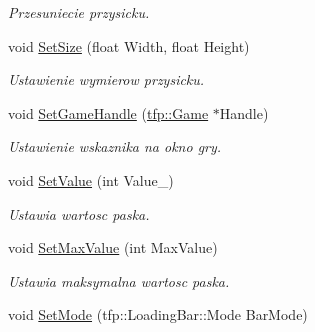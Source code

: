 \begin{DoxyCompactItemize}
\begin{DoxyCompactList}\small\item\em Przesuniecie przysicku. \end{DoxyCompactList}\item 
\mbox{\label{classtfp_1_1_loading_bar_ae297a4644a6892b6477ac21337033532}} 
void \mbox{\hyperlink{classtfp_1_1_loading_bar_ae297a4644a6892b6477ac21337033532}{Set\+Size}} (float Width, float Height)
\begin{DoxyCompactList}\small\item\em Ustawienie wymierow przysicku. \end{DoxyCompactList}\item 
\mbox{\label{classtfp_1_1_loading_bar_a326f9f40be8186b81ccc4636471fc3a9}} 
void \mbox{\hyperlink{classtfp_1_1_loading_bar_a326f9f40be8186b81ccc4636471fc3a9}{Set\+Game\+Handle}} (\mbox{\hyperlink{classtfp_1_1_game}{tfp\+::\+Game}} $\ast$Handle)
\begin{DoxyCompactList}\small\item\em Ustawienie wskaznika na okno gry. \end{DoxyCompactList}\item 
\mbox{\label{classtfp_1_1_loading_bar_a64a154f429156f741b6915f9c16e553a}} 
void \mbox{\hyperlink{classtfp_1_1_loading_bar_a64a154f429156f741b6915f9c16e553a}{Set\+Value}} (int Value\+\_\+)
\begin{DoxyCompactList}\small\item\em Ustawia wartosc paska. \end{DoxyCompactList}\item 
\mbox{\label{classtfp_1_1_loading_bar_a69eba1f326367ef7f1554ea4b1c87065}} 
void \mbox{\hyperlink{classtfp_1_1_loading_bar_a69eba1f326367ef7f1554ea4b1c87065}{Set\+Max\+Value}} (int Max\+Value)
\begin{DoxyCompactList}\small\item\em Ustawia maksymalna wartosc paska. \end{DoxyCompactList}\item 
\mbox{\label{classtfp_1_1_loading_bar_a28d094d7e6549a7ed9119809ae732f32}} 
void \mbox{\hyperlink{classtfp_1_1_loading_bar_a28d094d7e6549a7ed9119809ae732f32}{Set\+Mode}} (tfp\+::\+Loading\+Bar\+::\+Mode Bar\+Mode)

\end{DoxyCompactItemize}
